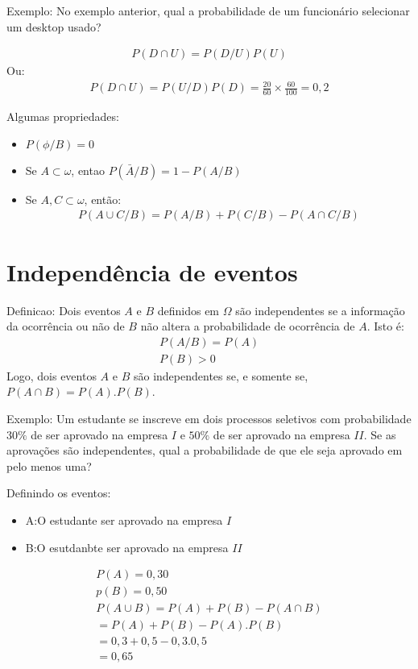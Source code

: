 \documentclass[11pt,a4paper]{article}
\begin{document}
Exemplo: No exemplo anterior, qual a probabilidade de um funcionário selecionar um 
desktop usado?
\begin{figure}
\end{figure}
\begin{align}
  P(D \cap U)= P(D/U)P(U)
\end{align}
Ou:
\begin{align}
  P(D \cap U)= P(U/D)P(D)= \frac{20}{60}\times \frac{60}{100}= 0,2
\end{align}

Algumas propriedades:
\begin{itemize}
  \item $P(\phi / B)=0$
  \item Se $A \subset \omega$, entao $P(\bar{A} / B)= 1-P(A/B)$
  \item Se $A,C \subset \omega$, então:
    \begin{align}
      P(A \cup C / B)= P(A/B)+ P(C/B) - P(A \cap C/B)
    \end{align}
\end{itemize}
\section{Independência de eventos}
Definicao: Dois eventos $A$ e $B$ definidos em $\Omega$ são independentes se 
a informação da ocorrência ou não de $B$ não altera a probabilidade de ocorrência
de $A$. Isto é:
\begin{align}
  P(A/B)= P(A) \\
  P(B)>0 
\end{align}
Logo, dois eventos $A$ e $B$ são independentes se, e somente se, $P(A \cap B)=P(A).P(B)$.

Exemplo: Um estudante se inscreve em dois processos seletivos com probabilidade 
$30\%$ de ser aprovado na empresa $I$ e $50\%$ de ser aprovado na empresa $II$. Se 
as aprovações são independentes, qual a probabilidade de que ele seja aprovado em
pelo menos uma?

Definindo os eventos:
\begin{itemize}
  \item A:\@ O estudante ser aprovado na empresa $I$
  \item B:\@ O esutdanbte ser aprovado na empresa $II$
\end{itemize}
\begin{align}
  P(A)= 0,30\\
  p(B)=0,50\\
  P(A\cup B)= P(A)+P(B)-P(A\cap B)\\
  =P(A)+P(B)-P(A).P(B)\\
  =0,3+0,5-0,3.0,5\\
  =0,65
\end{align}
\end{document}
